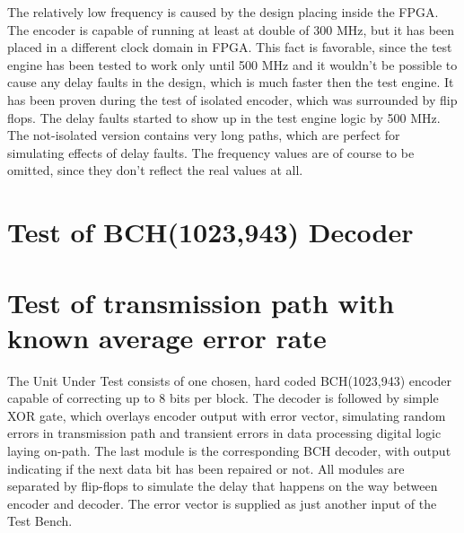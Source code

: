 The relatively low frequency is caused by the design placing inside the FPGA. The encoder is capable of running at least at double of 300 MHz, but it has been placed in a different clock domain in FPGA. This fact is favorable, since the test engine has been tested to work only until 500 MHz and it wouldn't be possible to cause any delay faults in the design, which is much faster then the test engine. It has been proven during the test of isolated encoder, which was surrounded by flip flops. The delay faults started to show up in the test engine logic by 500 MHz. The not-isolated version contains very long paths, which are perfect for simulating effects of delay faults. The frequency values are of course to be omitted, since they don't reflect the real values at all. 



\section{Test of BCH(1023,943) Decoder}
\section{Test of transmission path with known average error rate}
The Unit Under Test consists of one chosen, hard coded BCH(1023,943) encoder capable of correcting up to 8 bits per block. The decoder is followed by simple XOR gate, which overlays encoder output with error vector, simulating random errors in transmission path and transient errors in data processing digital logic laying on-path. The last module is the corresponding BCH decoder, with output indicating if the next data bit has been repaired or not. All modules are separated by flip-flops to simulate the delay that happens on the way between encoder and decoder. The error vector is supplied as just another input of the Test Bench.\\

